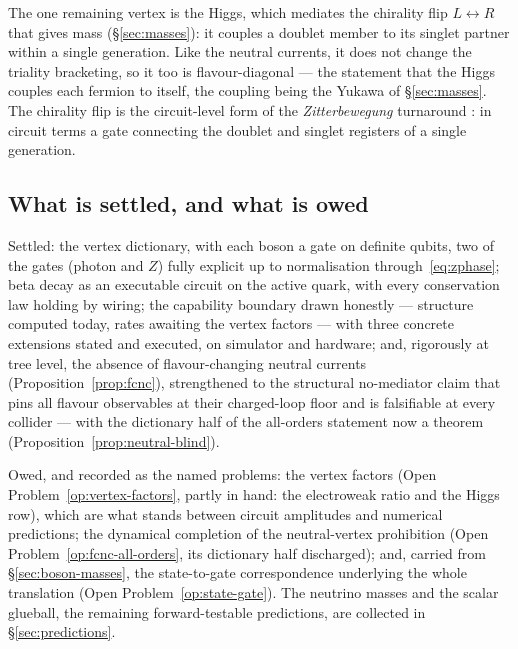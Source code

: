 The one remaining vertex is the Higgs, which mediates the chirality flip $L\leftrightarrow R$ that
gives mass (\S\ref{sec:masses}): it couples a doublet member to its singlet partner within a single
generation. Like the neutral currents, it does not change the triality bracketing, so it too is
flavour-diagonal --- the statement that the Higgs couples each fermion to itself, the coupling being
the Yukawa of \S\ref{sec:masses}. The chirality flip is the circuit-level form of the
\emph{Zitterbewegung} turnaround \autocite[628--632]{Penrose1994}: in circuit terms a gate connecting the doublet and singlet
registers of a single generation.

\subsection{What is settled, and what is owed}

Settled: the vertex dictionary, with each boson a gate on definite qubits, two of the gates
(photon and $Z$) fully explicit up to normalisation through~\eqref{eq:zphase}; beta decay as an
executable circuit on the active quark, with every conservation law holding by wiring; the
capability boundary drawn honestly --- structure computed today, rates awaiting the vertex factors
--- with three concrete extensions stated and executed, on simulator and hardware; and, rigorously at tree level, the absence
of flavour-changing neutral currents (Proposition~\ref{prop:fcnc}), strengthened to the structural
no-mediator claim that pins all flavour observables at their charged-loop floor and is falsifiable
at every collider --- with the dictionary half of the all-orders statement now a theorem
(Proposition~\ref{prop:neutral-blind}).

Owed, and recorded as the named problems: the vertex factors (Open Problem~\ref{op:vertex-factors},
partly in hand: the electroweak ratio and the Higgs row), which are what stands between circuit
amplitudes and numerical predictions; the dynamical completion of the neutral-vertex prohibition
(Open Problem~\ref{op:fcnc-all-orders}, its dictionary half discharged); and, carried from \S\ref{sec:boson-masses}, the
state-to-gate correspondence underlying the whole translation
(Open Problem~\ref{op:state-gate}). The neutrino masses and the scalar glueball, the remaining
forward-testable predictions, are collected in \S\ref{sec:predictions}.

